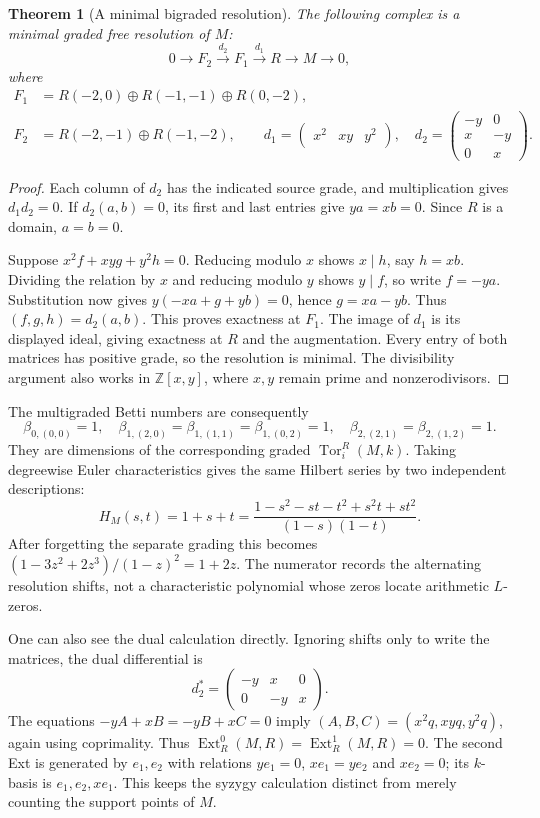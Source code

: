 \documentclass[11pt,oneside,openany]{book}
\newtheorem{theorem}{Theorem}[chapter]
\theoremstyle{definition}\newtheorem{definition}[theorem]{Definition}
\theoremstyle{remark}\newtheorem{remark}[theorem]{Remark}
\begin{document}
\begin{theorem}[A minimal bigraded resolution]\label{pers:resolution}
The following complex is a minimal graded free resolution of $M$:
\[
 0\longrightarrow F_2\xrightarrow{d_2}F_1\xrightarrow{d_1}R
       \longrightarrow M\longrightarrow0,
\]
where
\[
 \begin{split}
 F_1&=R(-2,0)\oplus R(-1,-1)\oplus R(0,-2),\\
 F_2&=R(-2,-1)\oplus R(-1,-2),\qquad
 d_1=\begin{pmatrix}x^2&xy&y^2\end{pmatrix},\quad
 d_2=\begin{pmatrix}-y&0\\x&-y\\0&x\end{pmatrix}.
 \end{split}
\]
\end{theorem}
\begin{proof}
Each column of $d_2$ has the indicated source grade, and multiplication
gives $d_1d_2=0$. If $d_2(a,b)=0$, its first and last entries give
$ya=xb=0$. Since $R$ is a domain, $a=b=0$.

Suppose $x^2f+xyg+y^2h=0$. Reducing modulo $x$ shows $x\mid h$,
say $h=xb$. Dividing the relation by $x$ and reducing modulo $y$
shows $y\mid f$, so write $f=-ya$. Substitution now gives
$y(-xa+g+yb)=0$, hence $g=xa-yb$. Thus
$(f,g,h)=d_2(a,b)$. This proves exactness at $F_1$. The image of
$d_1$ is its displayed ideal, giving exactness at $R$ and the
augmentation. Every entry of both matrices has positive grade, so the
resolution is minimal. The divisibility argument also works in
$\mathbb Z[x,y]$, where $x,y$ remain prime and nonzerodivisors.
\end{proof}

The multigraded Betti numbers are consequently
\[
 \beta_{0,(0,0)}=1,\quad
 \beta_{1,(2,0)}=\beta_{1,(1,1)}=\beta_{1,(0,2)}=1,\quad
 \beta_{2,(2,1)}=\beta_{2,(1,2)}=1.
\]
They are dimensions of the corresponding graded $\operatorname{Tor}^R_i(M,k)$.
Taking degreewise Euler characteristics gives the same Hilbert series by
two independent descriptions:
\[
 H_M(s,t)=1+s+t
 =\frac{1-s^2-st-t^2+s^2t+st^2}{(1-s)(1-t)}.
\]
After forgetting the separate grading this becomes
$(1-3z^2+2z^3)/(1-z)^2=1+2z$. The numerator records the alternating
resolution shifts, not a characteristic polynomial whose zeros locate
arithmetic $L$-zeros.

One can also see the dual calculation directly. Ignoring shifts only to
write the matrices, the dual differential is
\[
 d_2^*=\begin{pmatrix}-y&x&0\\0&-y&x\end{pmatrix}.
\]
The equations $-yA+xB=-yB+xC=0$ imply
$(A,B,C)=(x^2q,xyq,y^2q)$, again using coprimality. Thus
$\operatorname{Ext}^0_R(M,R)=\operatorname{Ext}^1_R(M,R)=0$.
The second Ext is generated by $e_1,e_2$ with relations
$ye_1=0$, $xe_1=ye_2$ and $xe_2=0$; its $k$-basis is
$e_1,e_2,xe_1$. This keeps the syzygy calculation distinct from merely
counting the support points of $M$.
\end{document}
